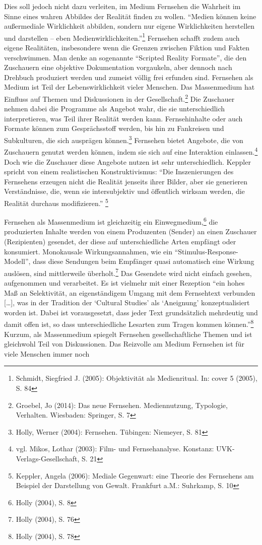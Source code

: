 Dies soll jedoch nicht dazu verleiten, im Medium Fernsehen die Wahrheit
im Sinne eines wahren Abbildes der Realität finden zu wollen.
\enquote{Medien können keine außermediale Wirklichkeit abbilden, sondern
nur eigene Wirklichkeiten herstellen und darstellen -- eben
Medienwirklichkeiten.}\footnote{Schmidt, Siegfried J. (2005):
  Objektivität als Medienritual. In: cover 5 (2005), S. 84} Fernsehen
schafft zudem auch eigene Realitäten, insbesondere wenn die Grenzen
zwischen Fiktion und Fakten verschwimmen. Man denke an sogenannte
\enquote{Scripted Reality Formate}, die den Zuschauern eine objektive
Dokumentation vorgaukeln, aber dennoch nach Drehbuch produziert werden
und zumeist völlig frei erfunden sind. Fernsehen als Medium ist Teil der
Lebenswirklichkeit vieler Menschen. Das Massenmedium hat Einfluss auf
Themen und Diskussionen in der Gesellschaft.\footnote{Groebel, Jo
  (2014): Das neue Fernsehen. Mediennutzung, Typologie, Verhalten.
  Wiesbaden: Springer, S. 7} Die Zuschauer nehmen dabei die Programme
als Angebot wahr, die sie unterschiedlich interpretieren, was Teil ihrer
Realität werden kann. Fernsehinhalte oder auch Formate können zum
Gesprächsstoff werden, bis hin zu Fankreisen und Subkulturen, die sich
ausprägen können.\footnote{Holly, Werner (2004): Fernsehen. Tübingen:
  Niemeyer, S. 81} Fernsehen bietet Angebote, die von Zuschauern genutzt
werden können, indem sie sich auf eine Interaktion einlassen.\footnote{vgl.
  Mikos, Lothar (2003): Film- und Fernsehanalyse. Konstanz:
  UVK-Verlags-Gesellschaft, S. 21} Doch wie die Zuschauer diese Angebote
nutzen ist sehr unterschiedlich. Keppler spricht von einem realistischen
Konstruktivismus: \enquote{Die Inszenierungen des Fernsehens erzeugen
nicht die Realität jenseits ihrer Bilder, aber sie generieren
Verständnisse, die, wenn sie intersubjektiv und öffentlich wirksam
werden, die Realität durchaus modifizieren.} \footnote{Keppler, Angela
  (2006): Mediale Gegenwart: eine Theorie des Fernsehens am Beispiel der
  Darstellung von Gewalt. Frankfurt a.M.: Suhrkamp, S. 10}

Fernsehen als Massenmedium ist gleichzeitig ein Einwegmedium,\footnote{Holly
  (2004), S. 8} die produzierten Inhalte werden von einem Produzenten
(Sender) an einen Zuschauer (Rezipienten) gesendet, der diese auf
unterschiedliche Arten empfängt oder konsumiert. Monokausale
Wirkungsannahmen, wie ein \enquote{Stimulus-Response-Modell}, dass diese
Sendungen beim Empfänger quasi automatisch eine Wirkung auslösen, sind
mittlerweile überholt.\footnote{Holly (2004), S. 76} Das Gesendete wird
nicht einfach gesehen, aufgenommen und verarbeitet. Es ist vielmehr mit
einer Rezeption \enquote{ein hohes Maß an Selektivität, an
eigenständigem Umgang mit dem Fernsehtext verbunden {[}\ldots{}{]}, was
in der Tradition der \enquote{Cultural Studies} als \enquote{Aneignung}
konzeptualisiert worden ist. Dabei ist vorausgesetzt, dass jeder Text
grundsätzlich mehrdeutig und damit offen ist, so dass unterschiedliche
Lesarten zum Tragen kommen können.}\footnote{Holly (2004), S. 78}
Kurzum, als Massenmedium spiegelt Fernsehen gesellschaftliche Themen und
ist gleichwohl Teil von Diskussionen. Das Reizvolle am Medium Fernsehen
ist für viele Menschen immer noch

